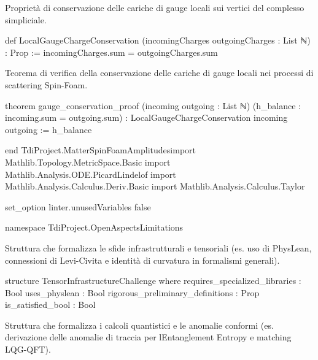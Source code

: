 \documentclass{article}
\newenvironment{Shaded}{%
  \begin{snugshade}%
}{%
  \end{snugshade}%
}%
\newenvironment{Highlighting}{%
}{%
}%
\newcommand{\NormalTok}[1]{#1}
\begin{document}
Proprietà di conservazione delle cariche di gauge locali sui vertici del
complesso simpliciale.

\begin{Shaded}
\begin{Highlighting}[]
\NormalTok{def LocalGaugeChargeConservation (incomingCharges outgoingCharges : List ℕ) : Prop :=}
\NormalTok{  incomingCharges.sum = outgoingCharges.sum}

\end{Highlighting}
\end{Shaded}

Teorema di verifica della conservazione delle cariche di gauge locali
nei processi di scattering Spin-Foam.

\begin{Shaded}
\begin{Highlighting}[]
\NormalTok{theorem gauge\_conservation\_proof (incoming outgoing : List ℕ) }
\NormalTok{  (h\_balance : incoming.sum = outgoing.sum) : LocalGaugeChargeConservation incoming outgoing := h\_balance}

\NormalTok{end TdiProject.MatterSpinFoamAmplitudesimport Mathlib.Topology.MetricSpace.Basic}
\NormalTok{import Mathlib.Analysis.ODE.PicardLindelof}
\NormalTok{import Mathlib.Analysis.Calculus.Deriv.Basic}
\NormalTok{import Mathlib.Analysis.Calculus.Taylor}

\NormalTok{set\_option linter.unusedVariables false}

\NormalTok{namespace TdiProject.OpenAspectsLimitations}

\end{Highlighting}
\end{Shaded}

Struttura che formalizza le sfide infrastrutturali e tensoriali (es. uso
di PhysLean, connessioni di Levi-Civita e identità di curvatura in
formalismi generali).

\begin{Shaded}
\begin{Highlighting}[]
\NormalTok{structure TensorInfrastructureChallenge where}
\NormalTok{  requires\_specialized\_libraries : Bool}
\NormalTok{  uses\_physlean : Bool}
\NormalTok{  rigorous\_preliminary\_definitions : Prop}
\NormalTok{  is\_satisfied\_bool : Bool}

\end{Highlighting}
\end{Shaded}

Struttura che formalizza i calcoli quantistici e le anomalie conformi
(es. derivazione delle anomalie di traccia per
l\textquotesingle Entanglement Entropy e matching LQG-QFT).
\end{document}
